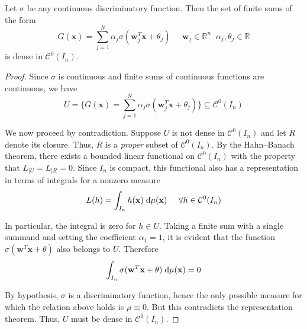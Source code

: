 \documentclass{article}
\numberwithin{equation}{subsection}
\begin{document}
\begin{theorem}
    Let $\sigma$ be any continuous discriminatory function. Then the set of finite sums of the form
    \begin{equation*}
        G(\textbf{x}) = \sum_{j=1}^N \alpha_j \sigma(\textbf{w}_j^T \textbf{x} + \theta_j) \;\;\;\;\; \textbf{w}_j \in \mathbb{R}^n \;\; \alpha_j, \theta_j \in \mathbb{R}
    \end{equation*}
    is dense in $\mathcal{C}^0(I_n)$.
\end{theorem}
\begin{proof}
    Since $\sigma$ is continuous and finite sums of continuous functions are continuous, we have 
    \begin{equation*}
        U = \Big\{ G(\textbf{x}) = \sum_{j=1}^N \alpha_j \sigma(\textbf{w}_j^T \textbf{x} + \theta_j) \Big\} \subseteq \mathcal{C}^0(I_n)
    \end{equation*}

    We now proceed by contradiction. Suppose $U$ is not dense in $\mathcal{C}^0(I_n)$ and let $R$ denote its closure. Thus, $R$ is a \textit{proper} subset of $\mathcal{C}^0(I_n)$. By the Hahn–Banach theorem, there exists a bounded linear functional on $\mathcal{C}^0(I_n)$ with the property that $L_{\vert U} = L_{\vert R} = 0$. Since $I_n$ is compact, this functional also has a representation in terms of integrals for a nonzero measure
    \begin{equation*}
        L(h) = \int_{I_n} h(\textbf{x}) \;\text{d} \mu(\textbf{x}) \;\;\;\;\; \forall h \in \mathcal{C}^0(I_n)
    \end{equation*}

    In particular, the integral is zero for $h \in U$. Taking a finite sum with a single summand and setting the coefficient $\alpha_1 = 1$, it is evident that the function $\sigma(\textbf{w}^T \textbf{x} + \theta)$ also belongs to $U$. Therefore
    \begin{equation*}
        \int_{I_n} \sigma(\textbf{w}^T \textbf{x} + \theta) \;\text{d} \mu(\textbf{x}) = 0
    \end{equation*}

    By hypothesis, $\sigma$ is a discriminatory function, hence the only possible measure for which the relation above holds is $\mu \equiv 0$. But this contradicts the representation theorem. Thus, $U$ must be dense in $\mathcal{C}^0(I_n)$.
\end{proof}
\end{document}
